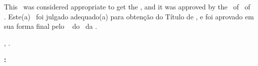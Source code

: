 


\begin{folhadeaprovacao}

    \begin{center}
        {\imprimirautor}

        \begin{center}
            \ABNTEXchapterfont\bfseries\MakeUppercase{\imprimirtitulo}\ifnotempty{\imprimirsubtitulo}{: \imprimirsubtitulo}
        \end{center}

        \begin{minipage}{\textwidth}
            \lang
            {
                This \imprimirtipotrabalho~was considered appropriate to get the \imprimirformacao,
                and it was approved by the \imprimirprograma~of \imprimircentro~of \imprimirinstituicao.
            }
            {
                Este(a) \imprimirtipotrabalho~foi julgado adequado(a) para obtenção do Título de \imprimirformacao,
                e foi aprovado em sua forma final pelo \imprimirprograma~
                do \imprimircentro~da \imprimirinstituicao.
            }
         \end{minipage}%
    \end{center}

    \begin{center}
        \imprimirlocal, \imprimirdata.
    \end{center}


    \begin{flushleft}
        \textbf{:}
    \end{flushleft}

    \assinatura{%
        \textbf{\imprimirorientador} \\ \imprimirorientadorRotulo\\
        \imprimirinstituicao~--~\imprimirinstituicaosigla
    }

    \ifnotempty{\imprimircoorientador}{%
        \assinatura{%
            \textbf{\imprimircoorientador} \\ \imprimircoorientadorRotulo \\
            \imprimirinstituicao~--~\imprimirinstituicaosigla
        }
    }


\end{folhadeaprovacao}
